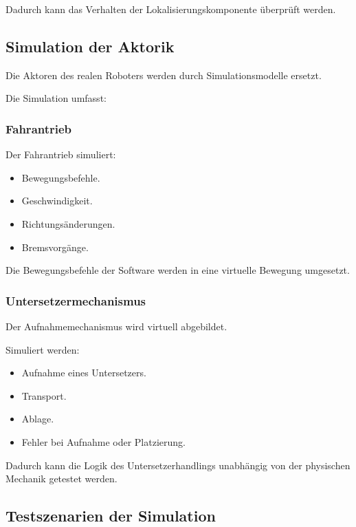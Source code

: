 Dadurch kann das Verhalten der Lokalisierungskomponente überprüft
werden.

\subsection{Simulation der Aktorik}\label{simulation-der-aktorik}

Die Aktoren des realen Roboters werden durch Simulationsmodelle ersetzt.

Die Simulation umfasst:

\subsubsection{Fahrantrieb}\label{fahrantrieb}

Der Fahrantrieb simuliert:

\begin{itemize}
\tightlist
\item
  Bewegungsbefehle.
\item
  Geschwindigkeit.
\item
  Richtungsänderungen.
\item
  Bremsvorgänge.
\end{itemize}

Die Bewegungsbefehle der Software werden in eine virtuelle Bewegung
umgesetzt.

\subsubsection{Untersetzermechanismus}\label{untersetzermechanismus}

Der Aufnahmemechanismus wird virtuell abgebildet.

Simuliert werden:

\begin{itemize}
\tightlist
\item
  Aufnahme eines Untersetzers.
\item
  Transport.
\item
  Ablage.
\item
  Fehler bei Aufnahme oder Platzierung.
\end{itemize}

Dadurch kann die Logik des Untersetzerhandlings unabhängig von der
physischen Mechanik getestet werden.

\subsection{Testszenarien der
Simulation}\label{testszenarien-der-simulation}

